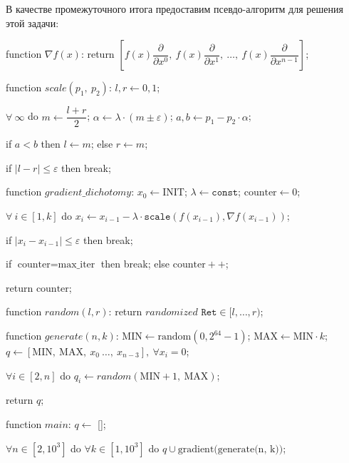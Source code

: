 \documentclass[12pt, a4paper, oneside, final]{article}
\begin{document}
	В качестве промежуточного итога предоставим псевдо-алгоритм для решения этой задачи:
	\begin{pseudocode}
function $\nabla{f(x)}$:
	return $\left[f(x)\dfrac{\partial}{\partial{x^{0}}}, ~ f(x)\dfrac{\partial}{\partial{x^{1}}}, ~ \ldots, ~ f(x)\dfrac{\partial}{\partial{x^{n - 1}}}\right]$;

function $scale(p_1, ~ p_2)$:
	$l, r \gets 0, 1$;

	$\forall~\infty$ do
		$m \gets \dfrac{l + r}{2}$;
		$\alpha \gets \lambda \cdot (m \pm \varepsilon)$;
		$a, b \gets p_1 - p_2 \cdot \alpha$;
		
		if $a < b$ then
			$l \gets m$;
		else
			$r \gets m$;

		if $|l - r| \leqslant \varepsilon$ then
			break;

function $gradient\_dichotomy$:
	$x_{0} \gets \text{INIT}$;
	$\lambda \gets \texttt{const}$;
	$\text{counter} \gets 0$;

	$\forall~i \in [1, k]$ do
		$x_{i} \gets x_{i - 1} - \lambda \cdot \texttt{scale}(f(x_{i - 1}), \nabla{f(x_{i - 1})})$;

		if $|x_{i} - x_{i - 1}| \leqslant \varepsilon$ then
			break;

		if $\text{counter} = \text{max\_iter}$ then
			break;
		else
			$\text{counter}++$;

	return $\text{counter}$;
		
function $random(l, r)$:
	return $randomized$ $\mathtt{Ret} \in [l, \ldots, r)$;

function $generate(n, k)$:
	$\text{MIN} \gets \text{random}(0, 2^{64} - 1)$;
	$\text{MAX} \gets \text{MIN} \cdot k$;
	$q \gets [\text{MIN},~\text{MAX},~x_{0}~\ldots,~x_{n - 3}], ~ \forall x_{i} = 0$;

	$\forall i \in [2, n]$ do
		$q_{i} \gets random(\text{MIN} + 1,~\text{MAX})$;

	return $q$;

function $main$:
	$q \gets$ [];

	$\forall n \in [2, 10^{3}]$ do
		$\forall k \in [1, 10^{3}]$ do
			$q \cup \text{gradient(generate(n, k))}$;
	\end{pseudocode}
\end{document}

